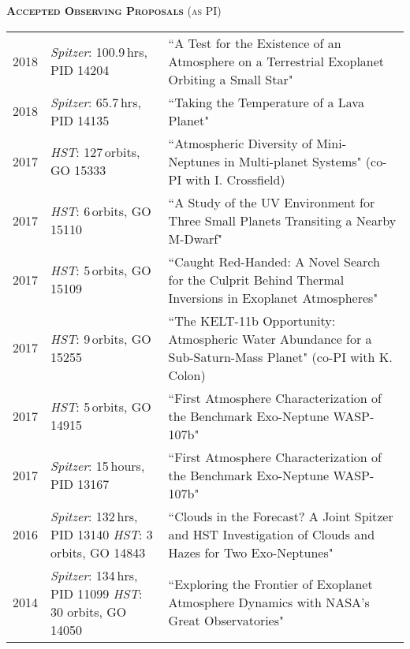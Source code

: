 \documentclass[12pt,letterpaper]{article}
\begin{document}
\vspace{5mm}
\textbf{\textsc{Accepted Observing Proposals}} \textsc{(as PI)}
\vspace{1mm}

\begin{tabular}{ l p{5.0cm} p{10cm}}
  2018 & \textit{Spitzer}: 100.9\,hrs, PID 14204 & ``A Test for the Existence of an Atmosphere on a Terrestrial Exoplanet 
    Orbiting a Small Star"\\
  2018 &  \textit{Spitzer}: 65.7\,hrs, PID 14135 & ``Taking the Temperature of a Lava Planet"\\
  2017 &  \textit{HST}: 127\,orbits, GO 15333& ``Atmospheric Diversity of Mini-Neptunes in Multi-planet Systems" (co-PI with I. Crossfield)\\
  2017 &  \textit{HST}: 6\,orbits, GO 15110& ``A Study of the UV Environment for Three Small Planets Transiting a Nearby M-Dwarf" \\
  2017 &  \textit{HST}: 5\,orbits, GO 15109& ``Caught Red-Handed: A Novel Search for the Culprit Behind Thermal Inversions in Exoplanet Atmospheres" \\
  2017 &  \textit{HST}: 9\,orbits, GO 15255& ``The KELT-11b Opportunity: Atmospheric Water Abundance for a Sub-Saturn-Mass Planet" (co-PI with K. Colon)\\
 2017 & \textit{HST}: 5\,orbits, GO 14915 & ``First Atmosphere Characterization of the Benchmark Exo-Neptune WASP-107b"\\
 2017 & \textit{Spitzer}: 15\,hours, PID 13167& ``First Atmosphere Characterization of the Benchmark Exo-Neptune WASP-107b"\\
2016 & \textit{Spitzer}: 132\,hrs, PID 13140 \textit{HST}: 3 orbits, GO 14843 & ``Clouds in the Forecast? A Joint Spitzer and HST Investigation of Clouds and Hazes for Two Exo-Neptunes"\\
2014 & \textit{Spitzer}: 134\,hrs, PID 11099 \textit{HST}: 30 orbits, GO 14050& ``Exploring the Frontier of Exoplanet Atmosphere Dynamics with NASA's Great Observatories"
\end{tabular}
\end{document}

